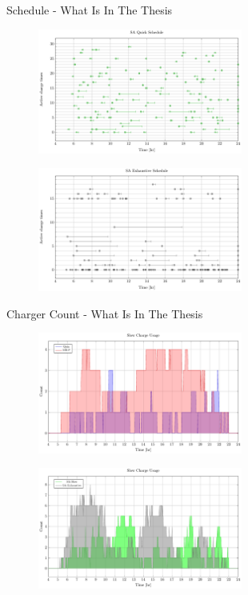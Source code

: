 \documentclass[bigger]{beamer}
\begin{document}
\begin{frame}[label={sec:orgffa3778}]{Schedule - What Is In The Thesis}
\begin{figure}[htpb]
\centering
    \includegraphics[width=0.6\textwidth]{img/sa-pap-paper-bad/schedule-sa-quick}
\end{figure}
\begin{figure}[htpb]
\centering
    \includegraphics[width=0.6\textwidth]{img/sa-pap-paper-bad/schedule-sa-heuristic}
\end{figure}
\end{frame}

\begin{frame}[label={sec:org1f52deb}]{Charger Count - What Is In The Thesis}
\begin{figure}[htpb]
\centering
    \includegraphics[width=0.6\textwidth]{img/sa-pap-paper-bad/charger-count-slow-milp-qin}
\end{figure}
\begin{figure}[htpb]
\centering
    \includegraphics[width=0.6\textwidth]{img/sa-pap-paper-bad/charger-count-slow-sa}
\end{figure}
\end{frame}
\end{document}
